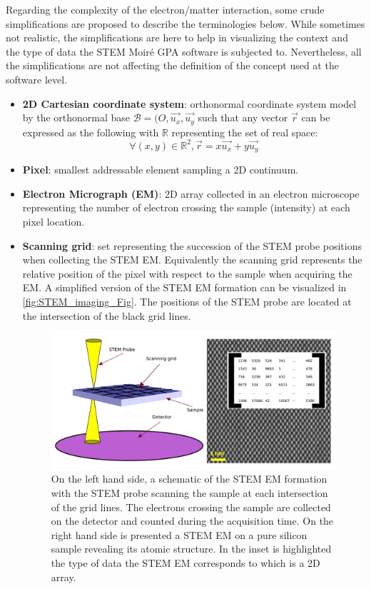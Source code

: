 \documentclass[12pt]{article}
\begin{document}
Regarding the complexity of the electron/matter interaction, some crude 
simplifications are proposed to describe the terminologies below. While 
sometimes not realistic, the simplifications are here to help in visualizing the 
context and the type of data the STEM Moir{\'e} GPA software is subjected to. Nevertheless, 
all the simplifications are not affecting the definition of the concept used at 
the software level.

\begin{itemize}

\item \textbf{2D Cartesian coordinate system}: orthonormal coordinate system model by the orthonormal base $\mathcal{B}=(O,\vec{u_x},\vec{u_y}$ such that any vector $\vec{r}$ can be expressed as the following with $\mathbb{R}$ representing the set of real space:
\begin{equation}
\forall (x,y) \in \mathbb{R}^{2}, \vec{r}=x\vec{u_x}+y\vec{u_y}
\end{equation}
\item \textbf{Pixel}: smallest addressable element sampling a 2D continuum.
\item \textbf{Electron Micrograph (EM)}: 2D array collected in an electron microscope 
representing the number of electron crossing the sample (intensity) at each 
pixel location.
\item \textbf{Scanning grid}: set representing the succession of the STEM probe positions when collecting the STEM EM. Equivalently the scanning grid represents the relative position of the pixel with respect to the sample when acquiring the EM. A simplified version of the 
STEM EM formation can be visualized in \cref{fig:STEM_imaging_Fig}. The positions of the STEM probe are located at the intersection of the black grid lines.
\begin{figure}[H]
\includegraphics[width=\linewidth]{Figures/STEM_imaging_Fig.png}
\caption{On the left hand side, a schematic of the STEM EM formation with the STEM probe scanning the sample at each intersection of the grid lines. The electrons crossing the sample are collected on the detector and counted during the acquisition time. On the right hand side is presented a STEM EM on a pure silicon sample revealing its atomic structure. In the inset is highlighted the type of data the STEM EM corresponds to which is a 2D array.}

\end{figure}
\end{itemize}
\end{document}
